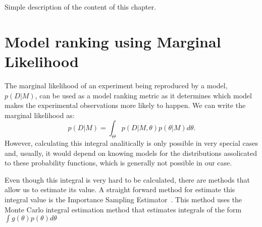 {\color{blue} Simple description of the content of this chapter}.

\section{Model ranking using Marginal Likelihood}
The marginal likelihood of an experiment being reproduced by a model, 
$p (D | M)$, can be used as a model ranking metric as it determines 
which model makes the experimental observations more likely to happen.
We can write the marginal likelihood as:
\begin{equation}
    p (D | M) = \int_{\Theta} p (D | M, \theta) p (\theta | M)d\theta.
\label{eq:marginal_likelihood}
\end{equation}
However, calculating this integral analitically is only possible in 
very special cases and, usually, it would depend on knowing models for 
the distributions assolicated to these probability functions, which is 
generally not possible in our case.

Even though this integral is very hard to be calculated, there are 
methods that allow us to estimate its value. A straight forward method 
for estimate this integral value is the Importance Sampling 
Estimator~\cite{Newton1993}. This method uses the Monte Carlo integral 
estimation method that estimates integrals of the form $\int g(\theta)p(\theta)d\theta$


